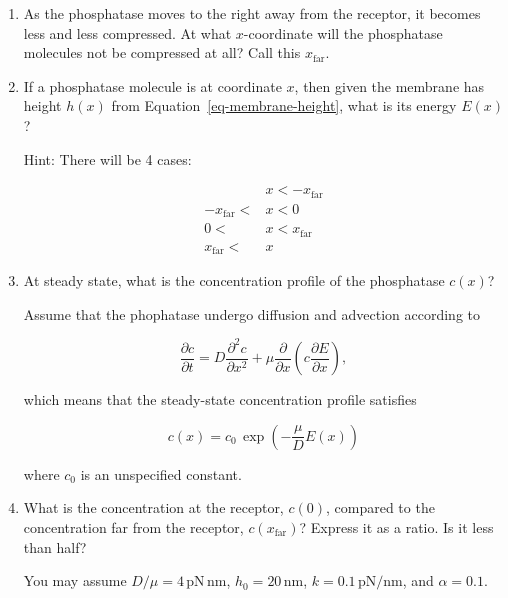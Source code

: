 \documentclass[
  letterpaper,
  DIV=11,
  numbers=noendperiod]{scrartcl}
\begin{document}
\begin{enumerate}
\def\labelenumi{\roman{enumi}.}
\item
  As the phosphatase moves to the right away from the receptor, it becomes less and less compressed.
  At what \(x\)-coordinate will the phosphatase molecules not be compressed at all?
  Call this \(x_\mathrm{far}\).
\item
  If a phosphatase molecule is at coordinate \(x\), then given the membrane has height \(h(x)\) from Equation~\ref{eq-membrane-height}, what is its energy \(E(x)\)?

  Hint: There will be 4 cases:

  \[
  \begin{aligned}
  &x < -x_\mathrm{far} \\
  -x_\mathrm{far} < &x < 0 \\
  0 < &x < x_\mathrm{far}\\
  x_\mathrm{far} < &x
  \end{aligned}
  \]
\item
  At steady state, what is the concentration profile of the phosphatase \(c(x)\)?

  Assume that the phophatase undergo diffusion and advection according to

  \[
  \frac{\partial c}{\partial t} = D \frac{\partial^2 c}{\partial x^2} + \mu \frac{\partial}{\partial x} \left( c \frac{\partial E}{\partial x}\right),
  \]

  which means that the steady-state concentration profile satisfies

  \[
  c(x) = c_0 \, \exp\left( -\frac{\mu}{D} E(x)\right)
  \]

  where \(c_0\) is an unspecified constant.
\item
  What is the concentration at the receptor, \(c(0)\), compared to the concentration far from the receptor, \(c(x_\mathrm{far})\)?
  Express it as a ratio.
  Is it less than half?

  You may assume \(D/\mu = 4\,\mathrm{pN}\,\mathrm{nm}\), \(h_0 = 20\,\mathrm{nm}\), \(k = 0.1\,\mathrm{pN}/\mathrm{nm}\), and \(\alpha = 0.1\).
\end{enumerate}
\end{document}
